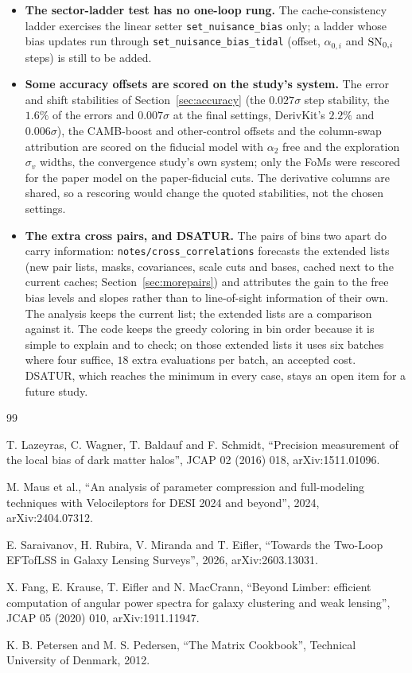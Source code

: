 \documentclass[11pt]{article}
\newcommand{\SNzi}{{\rm SN}_{0,i}}
\newcommand{\us}{\_\allowbreak}
\begin{document}
\begin{itemize}
  \item \textbf{The sector-ladder test has no one-loop rung.}  The
    cache-consistency ladder exercises the linear setter
    \texttt{set\us nuisance\us bias} only; a ladder whose bias updates
    run through \texttt{set\us nuisance\us bias\us tidal} (offset,
    $\alpha_{0,i}$ and $\SNzi$ steps) is still to be added.
  \item \textbf{Some accuracy offsets are scored on the study's
    system.}  The error and shift stabilities of
    Section~\ref{sec:accuracy} (the $0.027\sigma$ step stability, the
    $1.6\%$ of the errors and $0.007\sigma$ at the final settings,
    DerivKit's $2.2\%$ and $0.006\sigma$), the CAMB-boost and
    other-control offsets and the column-swap attribution are scored
    on the fiducial model with $\alpha_2$ free and the exploration
    $\sigma_v$ widths, the convergence study's own system; only the
    FoMs were rescored for the paper model on the paper-fiducial cuts.
    The derivative columns are shared, so a rescoring would change the
    quoted stabilities, not the chosen settings.
  \item \textbf{The extra cross pairs, and DSATUR.}  The pairs of
    bins two apart do carry information:
    \texttt{notes/cross\us correlations} forecasts the extended
    lists (new pair lists, masks, covariances, scale cuts and bases,
    cached next to the current caches; Section~\ref{sec:morepairs})
    and attributes the gain to the free bias levels and slopes
    rather than to line-of-sight information of their own.  The
    analysis keeps the current list; the extended lists are a
    comparison against it.
    The code keeps the greedy coloring in bin order because it is
    simple to explain and to check; on those extended lists it uses
    six batches where four suffice, $18$ extra evaluations per batch,
    an accepted cost.  DSATUR, which reaches the minimum in every
    case, stays an open item for a future study.
\end{itemize}

\begin{thebibliography}{99}

T. Lazeyras, C. Wagner, T. Baldauf and F. Schmidt,
``Precision measurement of the local bias of dark matter halos'',
JCAP 02 (2016) 018, arXiv:1511.01096.

M. Maus et al.,
``An analysis of parameter compression and full-modeling techniques
with Velocileptors for DESI 2024 and beyond'',
2024, arXiv:2404.07312.

E. Saraivanov, H. Rubira, V. Miranda and T. Eifler,
``Towards the Two-Loop EFTofLSS in Galaxy Lensing Surveys'',
2026, arXiv:2603.13031.

X. Fang, E. Krause, T. Eifler and N. MacCrann,
``Beyond Limber: efficient computation of angular power spectra for
galaxy clustering and weak lensing'',
JCAP 05 (2020) 010, arXiv:1911.11947.

K. B. Petersen and M. S. Pedersen,
``The Matrix Cookbook'',
Technical University of Denmark, 2012.

\end{thebibliography}
\end{document}
